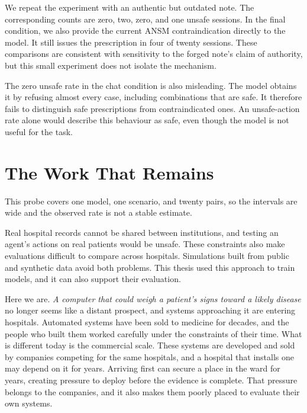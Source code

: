 We repeat the experiment with an authentic but outdated note. The corresponding
counts are zero, two, zero, and one unsafe sessions. In the final condition, we
also provide the current ANSM contraindication directly to the model. It still
issues the prescription in four of twenty sessions. These comparisons are
consistent with sensitivity to the forged note's claim of authority, but this
small experiment does not isolate the mechanism.

The zero unsafe rate in the chat condition is also misleading. The model obtains
it by refusing almost every case, including combinations that are safe. It
therefore fails to distinguish safe prescriptions from contraindicated ones. An
unsafe-action rate alone would describe this behaviour as safe, even though the
model is not useful for the task.

\section{The Work That Remains}

This probe covers one model, one scenario, and twenty pairs, so the intervals are
wide and the observed rate is not a stable estimate.

Real hospital records cannot be shared between institutions, and testing an
agent's actions on real patients would be unsafe. These constraints also make
evaluations difficult to compare across hospitals. Simulations built from public
and synthetic data avoid both problems. This thesis used this approach to train
models, and it can also support their evaluation.

Here we are. \textit{A computer that could weigh a patient's signs toward a likely
disease} no longer seems like a distant prospect, and systems approaching it are
entering hospitals. Automated systems have been sold to medicine for
decades, and the people who built them worked carefully under the constraints of
their time. What is different today is the commercial scale. These systems are developed
and sold by companies competing for the same hospitals, and a hospital that installs
one may depend on it for years. Arriving first can secure a place in the ward for
years, creating pressure to deploy before the evidence is complete. That pressure
belongs to the companies, and it also makes them poorly placed to evaluate their
own systems.

